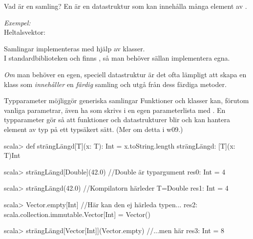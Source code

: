 
\ifkompendium\else
{}

\begin{Slide}{Vad är en samling?}
En   är en datastruktur som kan innehålla många element av .

\pause 
\vspace{2em}\emph{Exempel:} \\Heltalsvektor: \hfill{}

\pause 
{\SlideFontSmall\vspace{2em}Samlingar implementeras med hjälp av klasser. \\ I standardbiblioteken  och  finns  , så man behöver sällan implementera egna. 

\pause\vspace{0.5em}\emph{Om} man behöver en egen, speciell datastruktur är det ofta lämpligt att skapa en klass som \emph{innehåller} en \emph{färdig} samling och utgå från dess färdiga metoder.

}

\end{Slide}


\begin{Slide}{Typparameter möjliggör generiska samlingar}\SlideFontSmall
Funktioner och klasser kan, förutom vanliga parametrar, även ha  som skrivs i en egen parameterlista med . En typparameter gör så att funktioner och datastrukturer blir  och kan hantera element av  typ på ett typsäkert sätt. (Mer om detta i w09.)

\begin{REPLnonum}
scala> def strängLängd[T](x: T): Int = x.toString.length
strängLängd: [T](x: T)Int

scala> strängLängd[Double](42.0)  //Double är typargument
res0: Int = 4

scala> strängLängd(42.0) //Kompilatorn härleder T=Double
res1: Int = 4

scala> Vector.empty[Int] //Här kan den ej härleda typen...
res2: scala.collection.immutable.Vector[Int] = Vector()

scala> strängLängd[Vector[Int]](Vector.empty) //...men här
res3: Int = 8
\end{REPLnonum}
\end{Slide}

